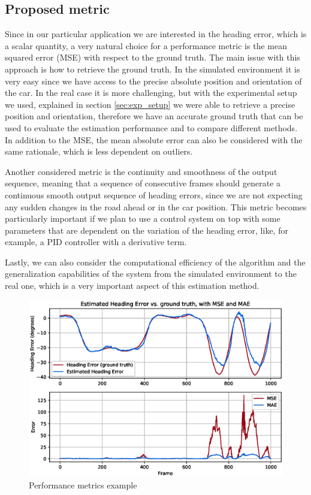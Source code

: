 \documentclass[a4paper,12pt,sort&compress]{article}
\begin{document}
    \subsection{Proposed metric}
    Since in our particular application we are interested in the heading error, which is a scalar
    quantity, a very natural choice for a performance metric is the mean squared error (MSE) with
    respect to the ground truth. The main issue with this approach is how to retrieve the ground
    truth. In the simulated environment it is very easy since we have access to the precise absolute position
    and orientation of the car. In the real case it is more challenging, but with the experimental
    setup we used, explained in section \ref*{sec:exp_setup} we were able to retrieve a precise
    position and orientation, therefore we have an accurate ground truth that can be used to
    evaluate the estimation performance and to compare different methods. In addition to the MSE,
    the mean absolute error can also be considered with the same rationale, which is less dependent
    on outliers. 

    Another considered metric is the continuity and smoothness of the output sequence,
    meaning that a sequence of consecutive frames should generate a continuous smooth output sequence
    of heading errors, since we are not expecting any sudden changes in the road ahead or in the car
    position. This metric becomes particularly important if we plan to use a control system on top
    with some parameters that are dependent on the variation of the heading error, like, for
    example, a PID controller with a derivative term. 

    Lastly, we can also consider the computational efficiency of the algorithm and the
    generalization capabilities of the system from the simulated environment to the real one, which
    is a very important aspect of this estimation method.  

    \begin{figure}
        \centering
        \includegraphics[width=\linewidth]{figures/performance_metrics_example.eps}
        \caption{Performance metrics example}
        \label{fig:performance_metrics_example}
    \end{figure}
\end{document}
